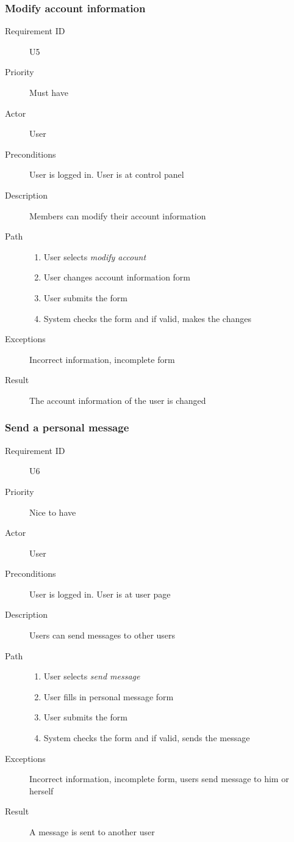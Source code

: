 		\subsubsection{Modify account information}
			\begin{description}
				\item[Requirement ID] U5
				\item[Priority] Must have
				\item[Actor] User
				\item[Preconditions] User is logged in. User is at control panel
				\item[Description] Members can modify their account information
				\item[Path]
 					\begin{enumerate}
						\item User selects \emph{modify account}
						\item User changes account information form
						\item User submits the form
						\item System checks the form and if valid, makes the changes
					\end{enumerate}
				\item[Exceptions] Incorrect information, incomplete form
				\item[Result] The account information of the user is changed
			\end{description}
		\subsubsection{Send a personal message}
			\begin{description}
				\item[Requirement ID] U6
				\item[Priority] Nice to have
				\item[Actor] User
				\item[Preconditions] User is logged in. User is at user page
				\item[Description] Users can send messages to other users
				\item[Path]
 					\begin{enumerate}
						\item User selects \emph{send message}
						\item User fills in personal message form
						\item User submits the form
						\item System checks the form and if valid, sends the message
					\end{enumerate}
				\item[Exceptions] Incorrect information, incomplete form, users send message to him or herself
				\item[Result] A message is sent to another user
			\end{description}
